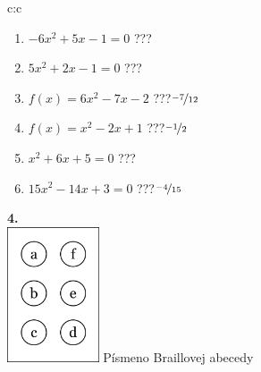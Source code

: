 \documentclass[10pt]{report}
\begin{document}
\begin{tabular}{c:c}
\begin{minipage}[c][104.5mm][t]{0.5\linewidth}
\begin{center}
\begin{minipage}{0.79\linewidth}
\begin{center}
\begin{varwidth}{\linewidth}
\begin{enumerate}
\Large
\item $-6x^2+5x-1=0$\quad \dotfill\; ???\;\dotfill {}
\item $5x^2+2x-1=0$\quad \dotfill\; ???\;\dotfill {}
\item $f(x)=6x^2-7x-2$\quad \dotfill\; ???\;\dotfill \quad $\nicefrac{-7}{12}$
\item $f(x)=x^2-2x+1$\quad \dotfill\; ???\;\dotfill \quad $\nicefrac{-1}{2}$
\item $x^2+6x+5=0$\quad \dotfill\; ???\;\dotfill {}
\item $15x^2-14x+3=0$\quad \dotfill\; ???\;\dotfill \quad $\nicefrac{-4}{15}$
\end{enumerate}
\end{varwidth}
\end{center}
\end{minipage}
\begin{minipage}{0.20\linewidth}
\begin{center}
{\Huge\bfseries 4.} \\[2mm]
\includegraphics[height=40mm]{../images/braille.png}
{\small Písmeno Braillovej abecedy}
\end{center}
\end{minipage}
\end{center}
\end{minipage}
%
\end{tabular}
\newpage
\thispagestyle{empty}
\end{document}
